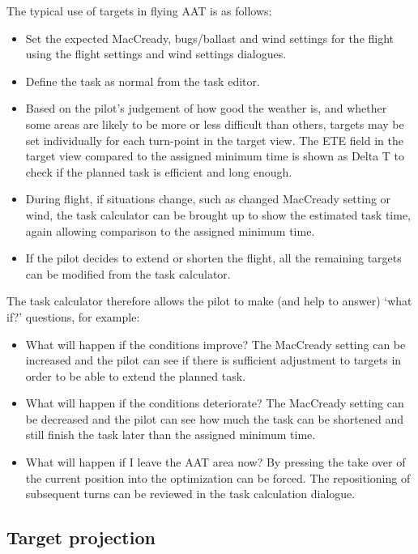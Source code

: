 The typical use of targets in flying AAT is as follows:
\begin{itemize}
\item Set the expected MacCready, bugs/ballast and wind settings
  for the flight using the flight settings and wind settings dialogues.
\item Define the task as normal from the task editor.
\item Based on the pilot's judgement of how good the weather is,
  and whether some areas are likely to be more or less difficult than
  others, targets may be set individually for each turn-point in the
  target view.  The ETE field in the target view compared to
  the assigned minimum time is shown as Delta T to check if the planned
  task is efficient and long enough.
\item During flight, if situations change, such as changed MacCready setting
  or wind, the task calculator can be brought up to show the estimated
  task time, again allowing comparison to the assigned minimum time.
\item If the pilot decides to extend or shorten the flight, all the remaining
  targets can be modified from the task calculator.
\end{itemize}

The task calculator therefore allows the pilot to make (and help to
answer) `what if?' questions, for example:
\begin{itemize}
\item What will happen if the conditions improve?  The MacCready setting can be
increased and the pilot can see if there is sufficient adjustment to targets in
order to be able to extend the planned task.
\item What will happen if the conditions deteriorate?  The MacCready setting can
be decreased and the pilot can see how much the task can be shortened and still
finish the task later than the assigned minimum time.
\item What will happen if I leave the AAT area now?  By pressing  the take over of the current position into the optimization can
be forced. The repositioning of subsequent turns can be reviewed in the task calculation
dialogue.
\end{itemize}

\subsection*{Target projection}

